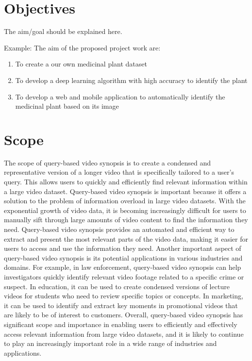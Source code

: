 \documentclass[12pt,a4paper]{report}
\begin{document}
\section{Objectives }
The aim/goal should be explained here.

Example: The aim  of the proposed project work are:
\begin{enumerate}
    \item To create a our own medicinal plant dataset
    \item To develop a deep learning algorithm with high accuracy to identify the plant
    \item To develop a web and mobile application to automatically identify the medicinal plant based on its image
\end{enumerate}

\section{Scope}
The scope of query-based video synopsis is to create a condensed and representative version of a longer video that is specifically tailored to a user's query. This allows users to quickly and efficiently find relevant information within a large video dataset.
Query-based video synopsis is important because it offers a solution to the problem of information overload in large video datasets. With the exponential growth of video data, it is becoming increasingly difficult for users to manually sift through large amounts of video content to find the information they need. Query-based video synopsis provides an automated and efficient way to extract and present the most relevant parts of the video data, making it easier for users to access and use the information they need.
Another important aspect of query-based video synopsis is its potential applications in various industries and domains. For example, in law enforcement, query-based video synopsis can help investigators quickly identify relevant video footage related to a specific crime or suspect. In education, it can be used to create condensed versions of  lecture videos for students who need to review specific topics or concepts. In marketing, it can be used to identify and extract key moments in promotional videos that are likely to be of interest to customers.
Overall, query-based video synopsis has significant scope and importance in enabling users to efficiently and effectively access relevant information from large video datasets, and it is likely to continue to play an increasingly important role in a wide range of industries and applications.
\end{document}
